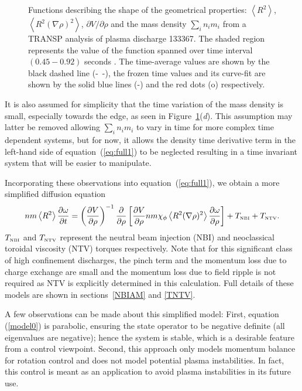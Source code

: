 \documentclass[12pt]{iopart}
\begin{document}
\begin{figure}
\begin{tabular}{cc}
\end{tabular}
\caption{Functions describing the shape of the geometrical properties: $\left< R^2 \right>$, $\left< R^2 (\nabla\rho)^2 \right>$, $\partial V/\partial \rho$ and  the mass density $ \sum_i n_i m_i $ from a TRANSP analysis of plasma discharge 133367.  The shaded region represents the value of the function spanned over time interval $(0.45-0.92)$ seconds . The time-average values are shown by the black dashed line (-~-), the frozen time values and its curve-fit are shown by the solid blue lines (-) and the red dots (o) respectively.}
\label{fig:geofunc}
\end{figure}

It is also assumed for simplicity that the time variation of the mass density is small, especially towards the edge, as seen in Figure~{\ref{fig:geofunc}}(\emph{d}). 
 This assumption may latter be removed allowing $ \sum_i n_i m_i $  to vary in time for more complex time dependent systems, but for now, it allows the density time derivative term in the left-hand side of equation~(\ref{eq:full1}) to be neglected resulting in a time invariant system that will be easier to manipulate.
 
 Incorporating these observations into equation~(\ref{eq:full1}), we obtain a more simplified diffusion equation
\begin{eqnarray}
  n m \left<R^2\right>
 \frac{\partial \omega}{\partial t} \nonumber 
 = \left( \frac{\partial V}{\partial\rho}\right)^{-1}
   \frac{\partial}{\partial \rho} 
   \left[\frac{\partial V}{\partial \rho} n m \chi_\phi 
   \left< R^2 (\nabla \rho)^2\right> 
   \frac{\partial\omega}{\partial\rho}\right] %
   + T_\textrm{\tiny NBI} + T_\textrm{\tiny NTV} .
\label{model0}
\end{eqnarray}
$T_\textrm{\tiny NBI} $ and $T_\textrm{\tiny NTV}$ represent the neutral beam injection (NBI) and neoclassical toroidal viscosity (NTV) torques respectively. Note that for this significant class of high confinement discharges, the pinch term and  the momentum loss due to charge exchange are small and the momentum loss due to  field ripple is not required as NTV is explicitly determined in this calculation. Full details of these models are shown in sections~\ref{NBIAM} and \ref{TNTV}.
  
A few observations can be made about this simplified model: First, equation  (\ref{model0}) is parabolic, ensuring the state operator to be negative definite (all eigenvalues are negative);  hence the system is stable, which is a desirable feature from a control viewpoint. 
Second, this approach only models momentum balance for rotation control and does not model potential plasma instabilities.
In fact, this control is meant as an application to avoid plasma instabilities in its future use.
  
\end{document}
